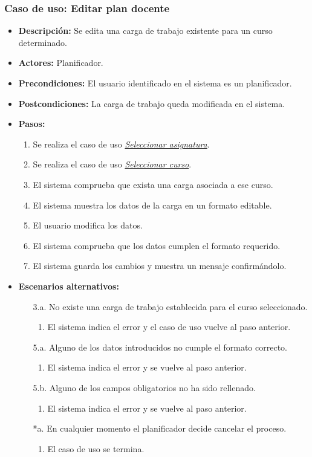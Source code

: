\subsubsection*{Caso de uso: Editar plan docente}
\begin{itemize}
\item{\bf Descripción:} Se edita una carga de trabajo existente para un curso determinado.
\item{\bf Actores:} Planificador.
\item{\bf Precondiciones:} El usuario identificado en el sistema es un planificador.
\item{\bf Postcondiciones:} La carga de trabajo queda modificada en el sistema.
\item{\bf Pasos:}
	\begin{enumerate}
	\item Se realiza el caso de uso {\em \hyperref[select_asignatura]{Seleccionar asignatura}}.
	\item Se realiza el caso de uso {\em \hyperref[select_curso]{Seleccionar curso}}.
	\item El sistema comprueba que exista una carga asociada a ese curso.
	\item El sistema muestra los datos de la carga en un formato editable.
	\item El usuario modifica los datos.
	\item El sistema comprueba que los datos cumplen el formato requerido.
	\item El sistema guarda los cambios y muestra un mensaje confirmándolo.
	\end{enumerate}
\item{\bf Escenarios alternativos:}
	\begin{itemize}
	\item[3.a.] No existe una carga de trabajo establecida para el curso seleccionado.
		\begin{enumerate}
		\item El sistema indica el error y el caso de uso vuelve al paso anterior.
		\end{enumerate}
	\item[5.a.] Alguno de los datos introducidos no cumple el formato correcto.
		\begin{enumerate}
		\item El sistema indica el error y se vuelve al paso anterior.
		\end{enumerate}
	\item[5.b.] Alguno de los campos obligatorios no ha sido rellenado.
		\begin{enumerate}
		\item El sistema indica el error y se vuelve al paso anterior.
		\end{enumerate}	
	\item[*a.] En cualquier momento el planificador decide cancelar el proceso.
		\begin{enumerate}
		\item El caso de uso se termina.
		\end{enumerate}
	\end{itemize}
\end{itemize}



